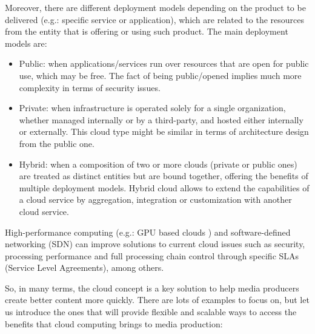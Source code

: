 Moreover, there are different deployment models depending on the product to be delivered (e.g.: specific service or application), which are related to the resources from the entity that is offering or using such product. The main deployment models are:

\begin{itemize}
\item Public: when applications/services run over resources that are open for public use, which may be free. The fact of being public/opened implies much more complexity in terms of security issues.
\item Private: when infrastructure is operated solely for a single organization, whether managed internally or by a third-party, and hosted either internally or externally. This cloud type might be similar in terms of architecture design from the public one.
\item Hybrid: when a composition of two or more clouds (private or public ones) are treated as distinct entities but are bound together, offering the benefits of multiple deployment models. Hybrid cloud allows to extend the capabilities of a cloud service by aggregation, integration or customization with another cloud service.
\end{itemize}

High-performance computing (e.g.: GPU based clouds \cite{gpu}) and software-defined networking (SDN) can improve solutions to current cloud issues such as security, processing performance and full processing chain control through specific SLAs (Service Level Agreements), among others.

So, in many terms, the cloud concept is a key solution to help media producers create better content more quickly. There are lots of examples to focus on, but let us introduce the ones that will provide flexible and scalable ways to access the benefits that cloud computing brings to media production:

